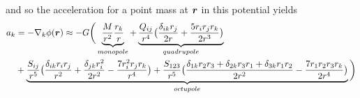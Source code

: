and so the acceleration for a point mass at $\boldsymbol{r}$ in this potential yields
\begin{align}
a_{k} &= - \nabla_{k} \phi(\boldsymbol{r}) \approx - G \bigg(
\underbrace{ \frac{M}{r^{2}} \frac{r_{k}}{r} }_{monopole}+ 
\underbrace{ \frac{Q_{i j}}{r^{4}}
\big( \frac{\delta_{i k} r_{j} }{2r} + \frac{5 r_{i} r_{j} r_{k} }{2r^{3}} \big)
}_{quadrupole} \nonumber \\
&+ \underbrace{ \frac{S_{i j}}{r^{5}}
\big( \frac{ \delta_{i k} r_{i} r_{j} }{r^{2}}
+ \frac{ \delta_{j k} r_{i}^{2} }{2 r^{2} }
- \frac{7 r_{i}^{2} r_{j} r_{k} }{r^{4} } \big) 
 + \frac{S_{1 2 3}}{r^{5} }
\big( \frac{\delta_{1 k} r_{2} r_{3} + \delta_{2 k} r_{3} r_{1} + \delta_{3 k} r_{1} r_{2}}{2 r^{2}} 
- \frac{7 r_{1} r_{2} r_{3} r_{k} }{2 r^{4}}\big) 
}_{octupole}
\bigg)
\end{align}

